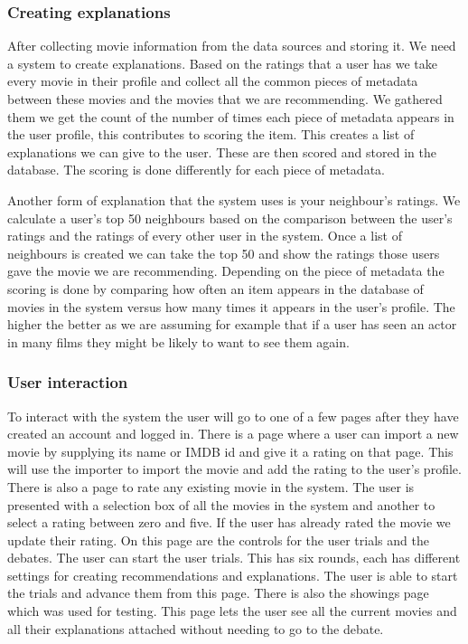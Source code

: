                 \subsubsection{Creating explanations}
                    After collecting movie information from the data sources and storing it. We need a system to create explanations. Based on the ratings that a user has we take every movie in their profile and collect all the common pieces of metadata between these movies and the movies that we are recommending. We gathered them we get the count of the number of times each piece of metadata appears in the user profile, this contributes to scoring the item. This creates a list of explanations we can give to the user. These are then scored and stored in the database. The scoring is done differently for each piece of metadata. 


                    Another form of explanation that the system uses is your neighbour's ratings. We calculate a user's top 50 neighbours based on the comparison between the user's ratings and the ratings of every other user in the system. Once a list of neighbours is created we can take the top 50 and show the ratings those users gave the movie we are recommending. Depending on the piece of metadata the scoring is done by comparing how often an item appears in the database of movies in the system versus how many times it appears in the user's profile. The higher the better as we are assuming for example that if a user has seen an actor in many films they might be likely to want to see them again. 


                    \subsubsection{User interaction}\label{sec:3UserInteractionDesign}
                    To interact with the system the user will go to one of a few pages after they have created an account and logged in. There is a page where a user can import a new movie by supplying its name or IMDB id and give it a rating on that page. This will use the importer to import the movie and add the rating to the user's profile. There is also a page to rate any existing movie in the system. The user is presented with a selection box of all the movies in the system and another to select a rating between zero and five. If the user has already rated the movie we update their rating. On this page are the controls for the user trials and the debates. The user can start the user trials. This has six rounds, each has different settings for creating recommendations and explanations. The user is able to start the trials and advance them from this page. There is also the showings page which was used for testing. This page lets the user see all the current movies and all their explanations attached without needing to go to the debate.

